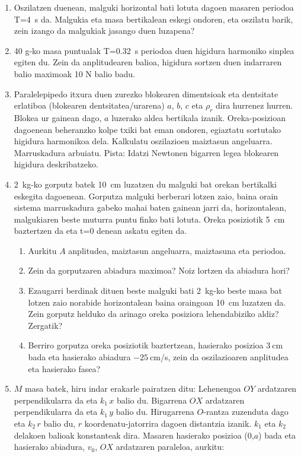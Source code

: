 \documentclass[12pt,twoside]{article}
\begin{document}
\begin{enumerate}
\item
Oszilatzen duenean, malguki horizontal bati lotuta dagoen masaren periodoa 
T=4~s
da. Malgukia eta masa bertikalean eskegi ondoren, eta oszilatu barik, zein 
izango
 da malgukiak jasango duen luzapena?

\item
40 g-ko masa   puntualak T=0.32~s periodoa duen
 higidura harmoniko sinplea egiten du. Zein da anplitudearen balioa, 
higidura  sortzen duen indarraren balio maximoak 10 N balio badu.

\item
Paralelepipedo itxura duen zurezko blokearen dimentsioak eta 
dentsitate erlatiboa (blokearen dentsitatea/urarena) $a$, $b$, $c$
 eta $\rho_r$ dira hurrenez hurren.
 Blokea ur gainean dago, $a$ luzerako aldea bertikala izanik. 
Oreka-posizioan dagoenean beheranzko kolpe txiki bat eman ondoren, 
egiaztatu sortutako higidura harmonikoa dela. 
Kalkulatu oszilazioen maiztasun angeluarra. Marruskadura  arbuiatu.
Pista: Idatzi Newtonen bigarren legea blokearen higidura deskribatzeko.

\item
2~kg-ko gorputz batek 10~cm luzatzen du malguki bat orekan bertikalki
eskegita dagoenean. Gorputza malguki berberari lotzen zaio, baina
orain sistema marruskadura gabeko mahai baten gainean jarri da,
horizontalean, malgukiaren beste muturra puntu finko bati
lotuta. Oreka posiziotik 5~cm baztertzen da eta t=0 denean askatu
egiten da.
\begin {enumerate}
\item Aurkitu $A$ anplitudea, maiztasun angeluarra, maiztasuna eta
periodoa.
\item Zein da gorputzaren abiadura maximoa? Noiz lortzen da abiadura hori?
\item Ezaugarri berdinak dituen beste malguki bati 2~kg-ko beste masa
  bat lotzen zaio norabide horizontalean baina oraingoan 10~cm
  luzatzen da. Zein gorputz helduko da arinago oreka posiziora
  lehendabiziko aldiz? Zergatik?
\item Berriro gorputza oreka posiziotik baztertzean, hasierako posizioa
$3~$cm bada eta hasierako abiadura $-25~$cm/s,
 zein da oszilazioaren anplitudea eta 
hasierako fasea?
\end{enumerate}

\item
$M$ masa batek, hiru indar erakarle pairatzen ditu: 
Lehenengoa $OY$ ardatzaren perpendikularra da eta  $k_1\,x$ balio du.
Bigarrena $OX$ ardatzaren perpendikularra da eta  $k_1\,y$ balio du.
Hirugarrena $O$-rantza zuzenduta dago eta $k_2\,r$ balio du, 
$r$ koordenatu-jatorrira dagoen distantzia izanik.
$k_1$ eta $k_2$ delakoen balioak konstanteak dira. Masaren hasierako posizioa
 (0,$a$) bada eta hasierako abiadura, $v_0$, $OX$ ardatzaren paraleloa, aurkitu:


\end{enumerate}
\end{document}
